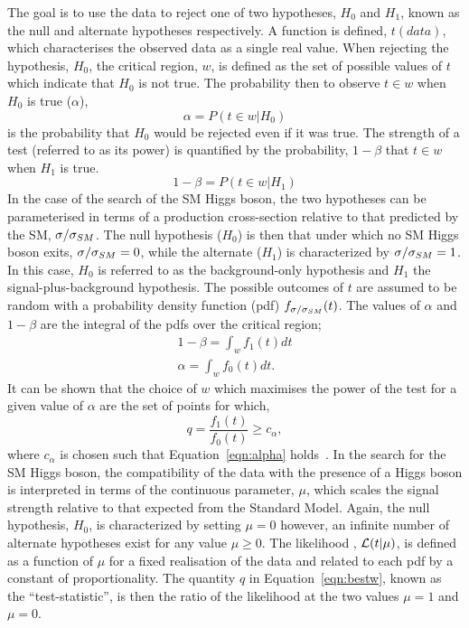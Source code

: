The goal is to use the data 
to reject one of two hypotheses,
$H_{0}$ and $H_{1}$, known as the null and alternate hypotheses
respectively. A function is defined, $t(data)$,
which characterises the observed data as a single real value. When rejecting 
the hypothesis, $H_{0}$, the critical
region, $w$, is defined as the set of possible values of $t$
which indicate that $H_{0}$ is not true. The probability then 
to observe $t\in w$ when $H_{0}$ is true ($\alpha$), 
\begin{equation}
\alpha = P(t\in w|H_{0})
\end{equation}
is the probability that $H_{0}$ would be rejected even if it was true.
The strength of a test (referred to as its power) is quantified by 
the probability, $1-\beta$ that $t \in  w$ when $H_{1}$ is true.
\begin{equation}
1-\beta = P(t\in w|H_{1})
\end{equation}
In the case of the search of the SM Higgs boson, the two hypotheses
can be parameterised in terms of a production cross-section relative
to that predicted by the SM, $\sigma/\sigma_{SM}$.  
The null hypothesis ($H_{0}$) is then that under which no SM Higgs boson exits,
$\sigma/\sigma_{SM}=0$, while the alternate ($H_{1}$) is characterized by $\sigma/\sigma_{SM}=1$.
In this case, $H_{0}$ is referred to as the background-only hypothesis
and $H_{1}$ the signal-plus-background hypothesis.
The possible outcomes of $t$ are assumed to be random with a probability density
function (pdf) $f_{\sigma/\sigma_{SM}}(t)$. The values of $\alpha$ and $1-\beta$ are the integral of the pdfs
over the critical region;
\begin{eqnarray}
1-\beta =  \int_{w}f_{1}(t)dt\\ 
\alpha =  \int_{w}f_{0}(t)dt.
\label{eqn:alpha}
\end{eqnarray}
It can be shown that the choice of $w$ which maximises the power of the test for 
a given value of $\alpha$ are the set of points for which,
\begin{equation} 
	q = \frac {\displaystyle f_{1}(t)}{\displaystyle f_{0}(t)} \ge c_{\alpha},
\label{eqn:bestw}
\end{equation}
where $c_{\alpha}$ is chosen such that Equation~\ref{eqn:alpha} holds~\citep{statsbook}.
In the search for the SM Higgs boson, the compatibility of the data
with the presence of a Higgs boson is interpreted in terms of the 
continuous parameter, $\mu$, which scales the signal strength relative to that expected
from the Standard Model. 
Again, the null hypothesis, $H_{0}$, is characterized by setting $\mu=0$ however,
an infinite number of alternate hypotheses exist for any value $\mu \ge 0$.
The likelihood , $\mathcal{L}(t|\mu)$, is defined as a function of $\mu$ for a fixed 
realisation of the data and related to each pdf by a constant of proportionality.
The quantity $q$ in Equation~\ref{eqn:bestw}, known as the ``test-statistic'', is then
the ratio of the likelihood at the two values $\mu=1$ and $\mu=0$. 

